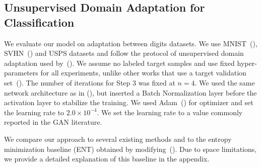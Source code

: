 \documentclass{article} \usepackage{iclr2018_conference,times}
\begin{document}
\subsection{Unsupervised Domain Adaptation for Classification}

We evaluate our model on adaptation between digits datasets. We use MNIST~(\cite{lecun1998gradient}), SVHN~(\cite{netzer2011reading}) and USPS datasets and follow the protocol of unsupervised domain adaptation used by~(\cite{tzeng2017adversarial}). We assume no labeled target samples and use fixed hyper-parameters for all experiments, unlike other works that use a target validation set~(\cite{saito2017asymmetric}). The number of iterations for Step 3 was fixed at $n=4$.
We used the same network architecture as in (\cite{tzeng2017adversarial}), but inserted a Batch Normalization layer before the activation layer to stabilize the training. We used Adam~(\cite{kingma2014adam}) for optimizer and set the learning rate to $2.0\times10^{-4}$. We set the learning rate to a value commonly reported in the GAN literature.


We compare our approach to several existing methods and to the entropy minimization baseline (ENT) obtained by modifying~(\cite{springenberg2015unsupervised}). Due to space limitations, we provide a detailed explanation of this baseline in the appendix.
\end{document}
